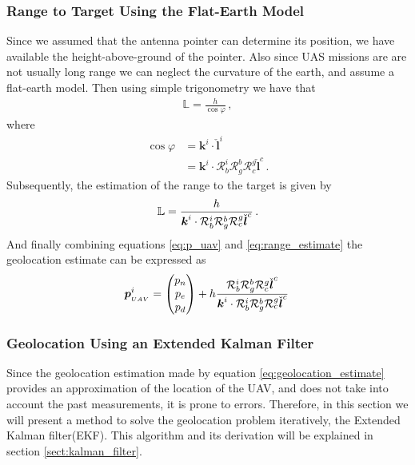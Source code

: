 \subsubsection{Range to Target Using the Flat-Earth Model}
Since we assumed that the antenna pointer can determine its position, we have available the height-above-ground of the pointer. Also since UAS missions are are not usually long range we can neglect the curvature of the earth, and assume a flat-earth model. Then using simple trigonometry we have that
\begin{align*}
\mathbb{L}=\frac{h}{\cos\varphi}\,,
\end{align*} 
where
\begin{align*}
\cos\varphi&=\boldsymbol{k}^i\cdot\check{\boldsymbol{l}}^i \\
		   &=\boldsymbol{k}^i\cdot\mathcal{R}_b^i\mathcal{R}_g^b\mathcal{R}_c^g\check{\boldsymbol{l}}^c\,.
\end{align*}
Subsequently, the estimation of the range to the target is given by
\begin{align}{\label{eq:range_estimate}}
\mathbb{L}=\frac{h}{\boldsymbol{k}^i\cdot\mathcal{R}_b^i\mathcal{R}_g^b\mathcal{R}_c^g\check{\boldsymbol{l}}^c}\,.
\end{align}
And finally combining equations \ref{eq:p_uav} and \ref{eq:range_estimate} the geolocation estimate can be expressed as
\begin{align}{\label{eq:geolocation_estimate}}
\boldsymbol{p}_{_{UAV}}^i=
\begin{pmatrix}
p_n \\
p_e \\
p_d 
\end{pmatrix}
+ h \frac{\mathcal{R}_b^i\mathcal{R}_g^b\mathcal{R}_c^g\check{\boldsymbol{l}}^c}{\boldsymbol{k}^i\cdot\mathcal{R}_b^i\mathcal{R}_g^b\mathcal{R}_c^g\check{\boldsymbol{l}}^c}\,
\end{align}
\subsubsection{Geolocation Using an Extended Kalman Filter}{\label{sub:geolocatoin_with_EKF}}
Since the geolocation estimation made by equation \ref{eq:geolocation_estimate} provides an approximation of the location of the UAV, and does not take into account the past measurements, it is prone to errors. Therefore, in this section we will present a method to solve the geolocation problem iteratively, the Extended Kalman filter(EKF). This algorithm and its derivation will be explained in section \ref{sect:kalman_filter}.

